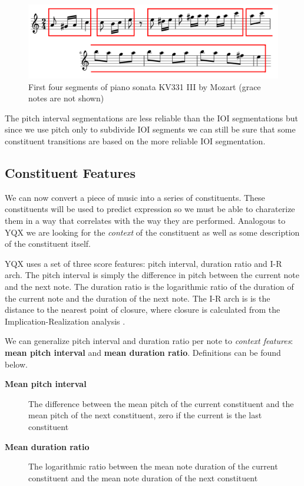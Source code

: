 \documentclass[a4paper,10pt]{article}
\begin{document}
\begin{figure}
\includegraphics[scale=3]{img/melodysegments}
\caption{First four segments of piano sonata KV331 III by Mozart (grace notes are not shown)}
\label{fig:mozartsegments}
\end{figure}

The pitch interval segmentations are less reliable than the IOI segmentations but since we use pitch only to subdivide IOI segments we can still be sure that some constituent transitions are based on the more reliable IOI segmentation.

\subsection{Constituent Features}
\label{sec:scorefeatures}

We can now convert a piece of music into a series of constituents. These constituents will be used to predict expression so we must be able to charaterize them in a way that correlates with the way they are performed. Analogous to YQX we are looking for the \textit{context} of the constituent as well as some description of the constituent itself.

YQX uses a set of three score features: pitch interval, duration ratio and I-R arch. The pitch interval is simply the difference in pitch between the current note and the next note. The duration ratio is the logarithmic ratio of the duration of the current note and the duration of the next note.  The I-R arch is is the distance to the nearest point of closure, where closure is calculated from the Implication-Realization analysis \cite{narmour1990analysis}. 

We can generalize pitch interval and duration ratio per note to \textit{context features}: \textbf{mean pitch interval} and \textbf{mean duration ratio}. Definitions can be found below. 
\begin{description}
\item[\textbf{Mean pitch interval}] 
The difference between the mean pitch of the current constituent and the mean pitch of the next constituent, zero if the current is the last constituent
\item[\textbf{Mean duration ratio}]
The logarithmic ratio between the mean note duration of the current constituent and the mean note duration of the next constituent
\end{description}
\end{document}
